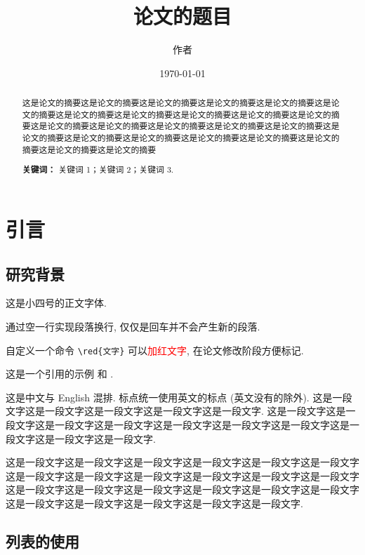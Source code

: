 \documentclass[12pt,final]{article}
\title{论文的题目}
\author{作者}
\date{\today}
\numberwithin{equation}{section}
\numberwithin{figure}{section}
\numberwithin{table}{section}
\theoremstyle{plain}
\newcommand{\red}[1]{\textcolor{red}{#1}}
\begin{document}
\maketitle

\begin{abstract}
这是论文的摘要这是论文的摘要这是论文的摘要这是论文的摘要这是论文的摘要这是论文的摘要这是论文的摘要这是论文的摘要这是论文的摘要这是论文的摘要这是论文的摘要这是论文的摘要这是论文的摘要这是论文的摘要这是论文的摘要这是论文的摘要这是论文的摘要这是论文的摘要这是论文的摘要这是论文的摘要这是论文的摘要这是论文的摘要这是论文的摘要这是论文的摘要

\medskip
\noindent\textbf{关键词：} 关键词 1；关键词 2；关键词 3.
\end{abstract}





\section{引言}

\subsection{研究背景}

这是小四号的正文字体.

通过空一行实现段落换行, 仅仅是回车并不会产生新的段落.

自定义一个命令 \verb|\red{文字}| 可以\red{加红文字}, 在论文修改阶段方便标记.

这是一个引用的示例 \cite{Adams2003}和 \cite{Shen1994,Tadmor2012,TreWei2014}.

这是中文与 English 混排. 标点统一使用英文的标点 (英文没有的除外). 这是一段文字这是一段文字这是一段文字这是一段文字这是一段文字. 这是一段文字这是一段文字这是一段文字这是一段文字这是一段文字这是一段文字这是一段文字这是一段文字这是一段文字这是一段文字.

这是一段文字这是一段文字这是一段文字这是一段文字这是一段文字这是一段文字这是一段文字这是一段文字这是一段文字这是一段文字这是一段文字这是一段文字这是一段文字这是一段文字这是一段文字这是一段文字这是一段文字这是一段文字这是一段文字这是一段文字这是一段文字这是一段文字这是一段文字.

\subsection{列表的使用}
\end{document}

